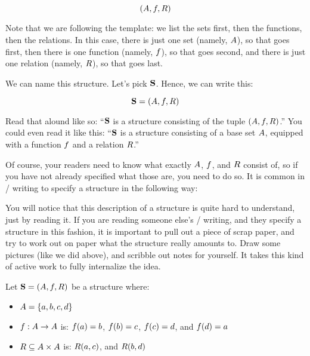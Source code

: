 \documentclass[../../../main.tex]{subfiles}
\begin{document}
\begin{equation*}
  (A, f, R)
\end{equation*}

Note that we are following the template: we list the sets first, then the functions, then the relations. In this case, there is just one set (namely, $A$), so that goes first, then there is one function (namely, $f$), so that goes second, and there is just one relation (namely, $R$), so that goes last.

We can name this structure. Let's pick $\mathbf{S}$. Hence, we can write this:

\begin{equation*}
  \mathbf{S} = (A, f, R)
\end{equation*}

Read that alound like so: ``$\mathbf{S}$ is a structure consisting of the tuple $(A, f, R)$.'' You could even read it like this: ``$\mathbf{S}$ is a structure consisting of a base set $A$, equipped with a function $f$ and a relation $R$.''

Of course, your readers need to know what exactly $A$, $f$, and $R$ consist of, so if you have not already specified what those are, you need to do so. It is common in \mathical/ writing to specify a structure in the following way:

\begin{aside}
  \begin{remark}
You will notice that this description of a structure is quite hard to understand, just by reading it. If you are reading someone else's \math/ writing, and they specify a structure in this fashion, it is important to pull out a piece of scrap paper, and try to work out on paper what the structure really amounts to. Draw some pictures (like we did above), and scribble out notes for yourself. It takes this kind of active work to fully internalize the idea.
  \end{remark}
\end{aside}

\begin{framed}
  Let $\mathbf{S} = (A, f, R)$ be a structure where:
  \begin{itemize}
    \item $A = \{ a, b, c, d \}$
    \item $f: A \rightarrow A$ is: $f(a) = b$, $f(b) = c$, $f(c) = d$, and $f(d) = a$
    \item $R \subseteq A \times A$ is: $R(a, c)$, and $R(b, d)$
  \end{itemize}
\end{framed}
\end{document}
